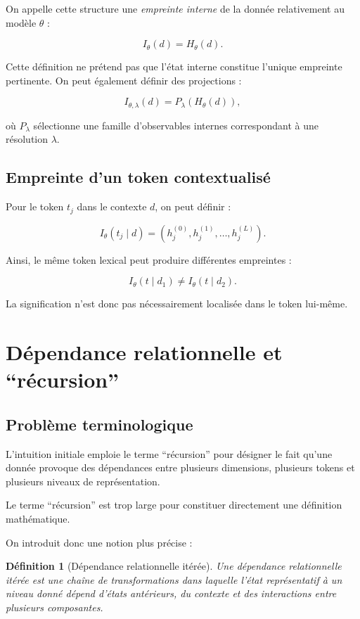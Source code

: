 \documentclass[11pt,a4paper]{article}
\newtheorem{definition}{Définition}[section]
\begin{document}
On appelle cette structure une \emph{empreinte interne} de la donnée
relativement au modèle $\theta$ :

\[
\boxed{
I_\theta(d)=H_\theta(d).
}
\]

Cette définition ne prétend pas que l'état interne constitue l'unique
empreinte pertinente. On peut également définir des projections :

\[
I_{\theta,\lambda}(d)
=
P_\lambda(H_\theta(d)),
\]

où $P_\lambda$ sélectionne une famille d'observables internes correspondant
à une résolution $\lambda$.

\subsection{Empreinte d'un token contextualisé}

Pour le token $t_j$ dans le contexte $d$, on peut définir :

\[
I_\theta(t_j\mid d)
=
\left(
h_j^{(0)},h_j^{(1)},\ldots,h_j^{(L)}
\right).
\]

Ainsi, le même token lexical peut produire différentes empreintes :

\[
I_\theta(t\mid d_1)
\neq
I_\theta(t\mid d_2).
\]

La signification n'est donc pas nécessairement localisée dans le token
lui-même.

\section{Dépendance relationnelle et ``récursion''}

\subsection{Problème terminologique}

L'intuition initiale emploie le terme ``récursion'' pour désigner le fait
qu'une donnée provoque des dépendances entre plusieurs dimensions, plusieurs
tokens et plusieurs niveaux de représentation.

Le terme ``récursion'' est trop large pour constituer directement une
définition mathématique.

On introduit donc une notion plus précise :

\begin{definition}[Dépendance relationnelle itérée]
Une dépendance relationnelle itérée est une chaîne de transformations dans
laquelle l'état représentatif à un niveau donné dépend d'états antérieurs,
du contexte et des interactions entre plusieurs composantes.
\end{definition}
\end{document}
